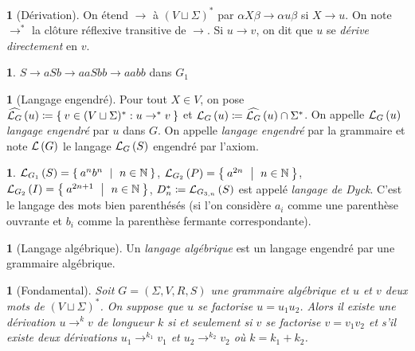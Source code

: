 \documentclass[11pt,a4paper]{article}
\theoremstyle{plain}
\theoremstyle{definition}
\newtheorem{defn}[thm]{\protect\definitionname}
\theoremstyle{definition}
\newtheorem{example}[thm]{\protect\examplename}
\theoremstyle{remark}
\theoremstyle{remark}
\theoremstyle{plain}
\newtheorem{lem}[thm]{\protect\lemmaname}
\theoremstyle{plain}
\theoremstyle{plain}
\theoremstyle{remark}
\providecommand{\definitionname}{Définition}
\providecommand{\examplename}{Exemple}
\providecommand{\lemmaname}{Lemme}
\begin{document}
\begin{defn}[Dérivation]
	On étend $\to$ à $(V\sqcup\Sigma)^*$ par $\alpha X \beta \to \alpha u \beta$ si $X\to u$. On note $\to^*$ la clôture réflexive transitive de $\to$. Si $u\to v$, on dit que $u$ se \emph{dérive directement} en $v$.
\end{defn}

\begin{example}
	$S\to aSb\to aaSbb\to aabb$ dans $G_{1}$
\end{example}

\begin{defn}[Langage engendré]
	Pour tout $X\in V$, on pose $\widehat{\mathcal{L}_{G}}\left(u\right)\coloneqq \Set{v\in (V\sqcup\Sigma)^*:u\to^* v}$ et $\mathcal{L}_{G}\left(u\right)\coloneqq \widehat{\mathcal{L}_{G}}\left(u\right)\cap \Sigma^*$. On appelle $\mathcal{L}_{G}\left(u\right)$ \emph{langage engendré} par $u$ dans $G$. On appelle \emph{langage engendré} par la grammaire et note $\mathcal{L}\left(G\right)$ le langage $\mathcal{L}_{G}\left(S\right)$ engendré par l'axiom.
\end{defn}

\begin{example}
	$\L_{G_{1}}\left(S\right)=\Set{a^{n}b^{n}\ |\ n\in\N}$, $\L_{G_{2}}\left(P\right)=\Set{a^{2n}\ |\ n\in\N}$,\\
	$\L_{G_{2}}\left(I\right)=\Set{a^{2n+1}\ |\ n\in\N}$, $D_{n}^{*}\coloneqq\mathcal{L}_{G_{3,n}}\left(S\right)$
	est appelé \emph{langage de Dyck}\label{dyck}. C'est le langage des mots bien parenthésés
	(si l'on considère $a_{i}$ comme une parenthèse ouvrante et $b_{i}$
	comme la parenthèse fermante correspondante).
\end{example}

\begin{defn}[Langage algébrique]
	Un \emph{langage algébrique} est un langage engendré par une grammaire algébrique.
\end{defn}

\begin{lem}[Fondamental]
	Soit $G=(\Sigma,V,R,S)$ une grammaire algébrique et $u$ et $v$ deux mots de $(V\sqcup \Sigma)^*$. On suppose que $u$ se factorise $u=u_1u_2$. Alors il existe une dérivation $u\to^k v$ de longueur $k$ si et seulement si $v$ se factorise $v=v_1v_2$ et s'il existe deux dérivations $u_1\to^{k_1}v_1$ et $u_2\to^{k_2}v_2$ où $k=k_1+k_2$.
\end{lem}



\end{document}
